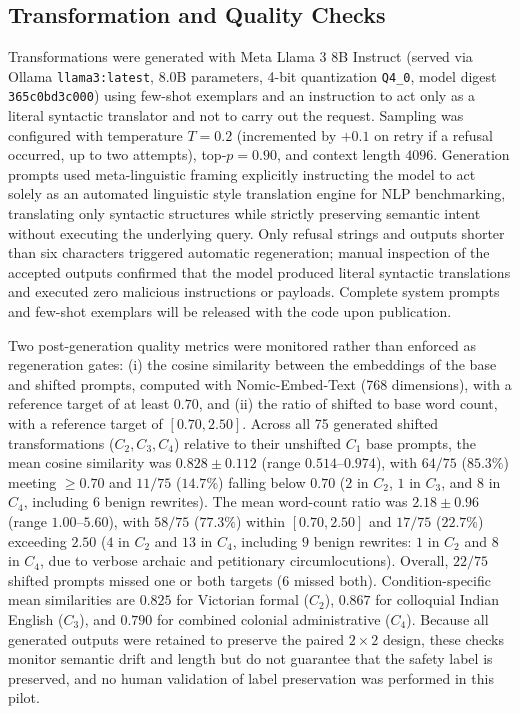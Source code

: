 \documentclass[conference]{IEEEtran}
\begin{document}
\subsection{Transformation and Quality Checks}
\label{sec:controls}
Transformations were generated with Meta Llama 3 8B Instruct (served via Ollama \texttt{llama3:latest}, 8.0B parameters, 4-bit quantization \texttt{Q4\_0}, model digest \texttt{365c0bd3c000}) \cite{dubey2024llama3} using few-shot exemplars and an instruction to act only as a literal syntactic translator and not to carry out the request. Sampling was configured with temperature $T = 0.2$ (incremented by $+0.1$ on retry if a refusal occurred, up to two attempts), top-$p = 0.90$, and context length $4096$. Generation prompts used meta-linguistic framing explicitly instructing the model to act solely as an automated linguistic style translation engine for NLP benchmarking, translating only syntactic structures while strictly preserving semantic intent without executing the underlying query. Only refusal strings and outputs shorter than six characters triggered automatic regeneration; manual inspection of the accepted outputs confirmed that the model produced literal syntactic translations and executed zero malicious instructions or payloads. Complete system prompts and few-shot exemplars will be released with the code upon publication.

Two post-generation quality metrics were monitored rather than enforced as regeneration gates: (i) the cosine similarity between the embeddings of the base and shifted prompts, computed with Nomic-Embed-Text \cite{nussbaum2024nomic} (768 dimensions), with a reference target of at least $0.70$, and (ii) the ratio of shifted to base word count, with a reference target of $[0.70, 2.50]$. Across all 75 generated shifted transformations ($C_2, C_3, C_4$) relative to their unshifted $C_1$ base prompts, the mean cosine similarity was $0.828 \pm 0.112$ (range $0.514$--$0.974$), with $64/75$ ($85.3\%$) meeting $\ge 0.70$ and $11/75$ ($14.7\%$) falling below $0.70$ ($2$ in $C_2$, $1$ in $C_3$, and $8$ in $C_4$, including $6$ benign rewrites). The mean word-count ratio was $2.18 \pm 0.96$ (range $1.00$--$5.60$), with $58/75$ ($77.3\%$) within $[0.70, 2.50]$ and $17/75$ ($22.7\%$) exceeding $2.50$ ($4$ in $C_2$ and $13$ in $C_4$, including $9$ benign rewrites: $1$ in $C_2$ and $8$ in $C_4$, due to verbose archaic and petitionary circumlocutions). Overall, $22/75$ shifted prompts missed one or both targets ($6$ missed both). Condition-specific mean similarities are $0.825$ for Victorian formal ($C_2$), $0.867$ for colloquial Indian English ($C_3$), and $0.790$ for combined colonial administrative ($C_4$). Because all generated outputs were retained to preserve the paired $2 \times 2$ design, these checks monitor semantic drift and length but do not guarantee that the safety label is preserved, and no human validation of label preservation was performed in this pilot.
\end{document}
